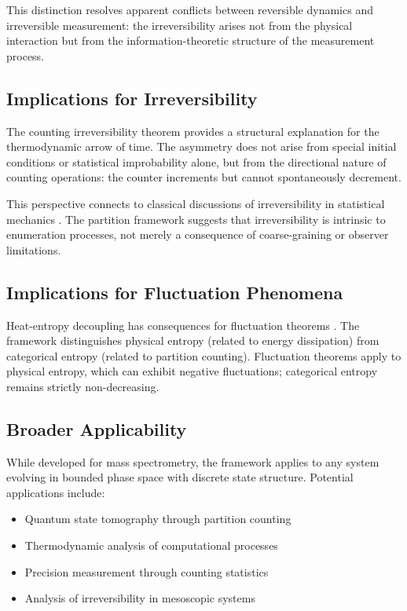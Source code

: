 This distinction resolves apparent conflicts between reversible dynamics and irreversible measurement: the irreversibility arises not from the physical interaction but from the information-theoretic structure of the measurement process.

\subsection{Implications for Irreversibility}

The counting irreversibility theorem provides a structural explanation for the thermodynamic arrow of time. The asymmetry does not arise from special initial conditions or statistical improbability alone, but from the directional nature of counting operations: the counter increments but cannot spontaneously decrement.

This perspective connects to classical discussions of irreversibility in statistical mechanics \citep{boltzmann1877, lebowitz1993}. The partition framework suggests that irreversibility is intrinsic to enumeration processes, not merely a consequence of coarse-graining or observer limitations.

\subsection{Implications for Fluctuation Phenomena}

Heat-entropy decoupling has consequences for fluctuation theorems \citep{jarzynski1997, crooks1999}. The framework distinguishes physical entropy (related to energy dissipation) from categorical entropy (related to partition counting). Fluctuation theorems apply to physical entropy, which can exhibit negative fluctuations; categorical entropy remains strictly non-decreasing.

\subsection{Broader Applicability}

While developed for mass spectrometry, the framework applies to any system evolving in bounded phase space with discrete state structure. Potential applications include:

\begin{itemize}
    \item Quantum state tomography through partition counting
    \item Thermodynamic analysis of computational processes
    \item Precision measurement through counting statistics
    \item Analysis of irreversibility in mesoscopic systems
\end{itemize}

